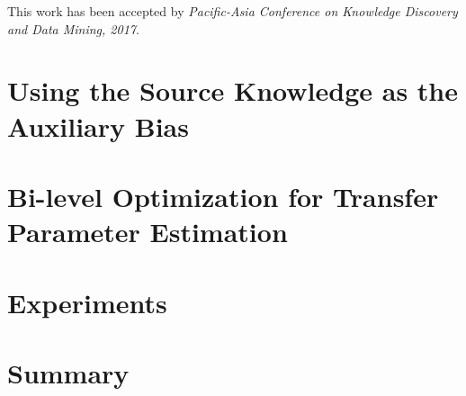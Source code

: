 This work has been accepted by \textit{Pacific-Asia Conference on Knowledge Discovery and Data Mining, 2017}.

\section{Using the Source Knowledge as the Auxiliary Bias}\label{sec:prob}


\section{Bi-level Optimization for Transfer Parameter Estimation}\label{sec:smitle}

%

\section{Experiments}\label{sec:exp}


\section{Summary}
